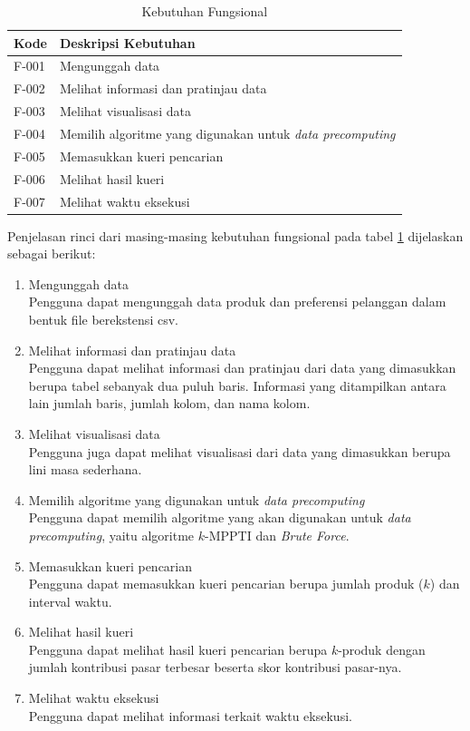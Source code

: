 \begin{table}[H]
	\centering
	\begin{tabular}{ | p{2cm} | p{7cm} | }
		\hline
		\textbf{Kode} & \textbf{Deskripsi Kebutuhan} \\ \hline \hline
		F-001 & Mengunggah data \\ \hline
		F-002 & Melihat informasi dan pratinjau data \\ \hline
		F-003 & Melihat visualisasi data  \\ \hline
		F-004 & Memilih algoritme yang digunakan untuk \textit{data precomputing}\\ \hline
		F-005 & Memasukkan kueri pencarian \\ \hline
		F-006 & Melihat hasil kueri \\ \hline
		F-007 & Melihat waktu eksekusi \\ \hline
	\end{tabular} \caption{Kebutuhan Fungsional}
	\label{tab:kebutuhan-fungsional}
\end{table}

Penjelasan rinci dari masing-masing kebutuhan fungsional pada tabel \ref{tab:kebutuhan-fungsional} dijelaskan sebagai berikut:
\begin{enumerate}
	\item Mengunggah data\\
	Pengguna dapat mengunggah data produk dan preferensi pelanggan dalam bentuk file berekstensi csv.
	\item Melihat informasi dan pratinjau data \\
	Pengguna dapat melihat informasi dan pratinjau dari data yang dimasukkan berupa tabel sebanyak dua puluh baris. Informasi yang ditampilkan antara lain jumlah baris, jumlah kolom, dan nama kolom.
	\item Melihat visualisasi data \\
	Pengguna juga dapat melihat visualisasi dari data yang dimasukkan berupa lini masa sederhana.
	\item Memilih algoritme yang digunakan untuk \textit{data precomputing} \\
	Pengguna dapat memilih algoritme yang akan digunakan untuk \textit{data precomputing}, yaitu algoritme $k$-MPPTI dan \textit{Brute Force}.
	\item Memasukkan kueri pencarian \\
	Pengguna dapat memasukkan kueri pencarian berupa jumlah produk ($k$) dan interval waktu.
	\item Melihat hasil kueri \\
	Pengguna dapat melihat hasil kueri pencarian berupa $k$-produk dengan jumlah kontribusi pasar terbesar beserta skor kontribusi pasar-nya. 
	\item Melihat waktu eksekusi \\
	Pengguna dapat melihat informasi terkait waktu eksekusi.
\end{enumerate}

